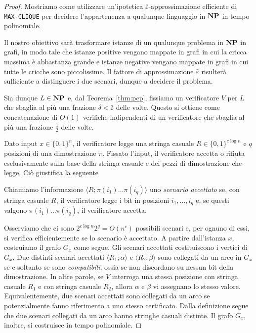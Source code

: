 \begin{proof}
	Mostriamo come utilizzare un'ipotetica $\bar\varepsilon$-approssimazione
	efficiente di \texttt{MAX-CLIQUE} per decidere l'appartenenza a qualunque
	linguaggio in $\mathbf{NP}$ in tempo polinomiale.

	Il nostro obiettivo sarà trasformare istanze di un qualunque problema in
	$\mathbf{NP}$ in grafi, in modo tale che istanze positive vengano mappate in
	grafi in cui la cricca massima è abbastanza grande e istanze negative
	vengano mappate in grafi in cui tutte le cricche sono piccolissime.
	Il fattore di approssimazione $\bar\varepsilon$ risulterà sufficiente a
	distinguere i due scenari, dunque a decidere il problema.

	Sia dunque $L \in \mathbf{NP}$ e, dal Teorema~\ref{thm:pcp}, fissiamo un
	verificatore $V$ per $L$ che sbaglia al più una frazione
	$\delta < \bar\varepsilon$ delle volte. Questo si ottiene come concatenazione
	di $O(1)$ verifiche indipendenti di un verificatore che sbaglia al più una
	frazione $\frac12$ delle volte.

	Dato input $x \in \{0, 1\}^n$, il verificatore legge una stringa casuale
	$R \in \{0, 1\}^{c \log n}$ e $q$ posizioni di una dimostrazione $\pi$.
	Fissato l'input, il verificatore accetta o rifiuta esclusivamente sulla
	base della stringa casuale e dei pezzi di dimostrazione che legge.
	Ciò giustifica la seguente

	\begin{definition}
		Chiamiamo l'informazione $\langle R; \pi(i_1) \ldots \pi(i_q) \rangle$
		uno \emph{scenario accettato} se, con stringa casuale $R$, il
		verificatore legge i bit in posizioni $i_1, \ldots, i_q$ e, se questi
		valgono $\pi(i_1) \ldots \pi(i_q)$, il verificatore accetta.
	\end{definition}

	Osserviamo che ci sono $2^{c \log n} 2^q = O(n^c)$ possibili scenari e, per
	ognuno di essi, si verifica efficientemente se lo scenario è accettato.
	A partire dall'istanza $x$, costruiamo il grafo $G_x$ come segue.
	Gli scenari accettati costituiscono i vertici di $G_x$.
	Due distinti scenari accettati $\langle R_1; \alpha \rangle$ e
	$\langle R_2; \beta \rangle$ sono collegati da un arco in $G_x$ se e
	soltanto se sono \emph{compatibili}, ossia se non discordano su nessun bit
	della dimostrazione. In altre parole, se $V$ interroga una stessa posizione
	con stringa casuale $R_1$ e con stringa casuale $R_2$, allora $\alpha$ e
	$\beta$ vi assegnano lo stesso valore.
	Equivalentemente, due scenari accettati sono collegati da un arco se
	potenzialmente fanno riferimento a uno stesso certificato.
	Dalla definizione segue che due scenari collegati da un arco hanno stringhe
	casuali distinte.
	Il grafo $G_x$, inoltre, si costruisce in tempo polinomiale.


\end{proof}
